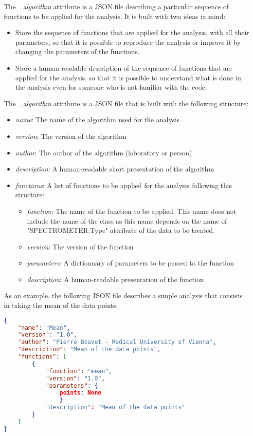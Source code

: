 The \textit{\_algorithm} attribute is a JSON file describing a particular sequence of functions to be applied for the analysis. It is built with two ideas in mind:
\begin{itemize}
    \item Store the sequence of functions that are applied for the analysis, with all their parameters, so that it is possible to reproduce the analysis or improve it by changing the parameters of the functions.
    \item Store a human-readable description of the sequence of functions that are applied for the analysis, so that it is possible to understand what is done in the analysis even for someone who is not familiar with the code.
\end{itemize}

The \textit{\_algorithm} attribute is a JSON file that is built with the following structure:
\begin{itemize}
    \item \textit{name}: The name of the algorithm used for the analysis
    \item \textit{version}: The version of the algorithm
    \item \textit{author}: The author of the algorithm (laboratory or person)
    \item \textit{description}: A human-readable short presentation of the algorithm
    \item \textit{functions}: A list of functions to be applied for the analysis following this structure:
    \begin{itemize}
        \item \textit{function}: The name of the function to be applied. This name does not include the name of the class as this name depends on the name of "SPECTROMETER.Type" attribute of the data to be treated.
        \item \textit{version}: The version of the function
        \item \textit{parameters}: A dictionnary of parameters to be passed to the function
        \item \textit{description}: A human-readable presentation of the function
    \end{itemize}
\end{itemize}

As an example, the following JSON file describes a simple analysis that consists in taking the mean of the data points:

\begin{lstlisting}[language=json]
{
    "name": "Mean",
    "version": "1.0",
    "author": "Pierre Bouvet - Medical University of Vienna",
    "description": "Mean of the data points",
    "functions": [
        {
            "function": "mean",
            "version": "1.0",
            "parameters": {
                points: None
                }
            "description": "Mean of the data points"
        }
    ]
}
\end{lstlisting}

